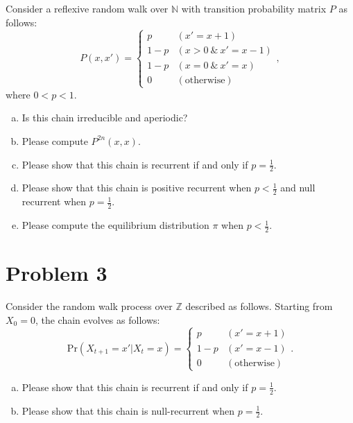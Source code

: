 \documentclass[a4paper,11pt]{article}
\newcommand{\pr}{\mathrm{Pr}}
\newcommand{\nsp}{\mathbb{N}}
\newcommand{\zsp}{\mathbb{Z}}
\begin{document}
Consider a reflexive random walk over $\nsp$ with transition probability matrix $P$ as follows:
\[
P(x, x') = \begin{cases}
     p & (x' = x + 1) \\
     1 - p & (x > 0 \ \& \ x' = x - 1) \\
     1 - p & (x = 0 \ \& \ x' = x) \\
     0 & (\text{otherwise})
 \end{cases},
\]
where $0 < p < 1$. 

\begin{enumerate}[(a)]

\item Is this chain irreducible and aperiodic?

\item Please compute $P^{2n}(x, x)$. 

\item Please show that this chain is recurrent if and only if $p = \frac{1}{2}$.

\item Please show that this chain is positive recurrent when $p < \frac{1}{2}$ and null recurrent when $p = \frac{1}{2}$. 

\item Please compute the equilibrium distribution $\pi$ when $p < \frac{1}{2}$.

\end{enumerate}

\clearpage

\section*{Problem 3}

Consider the random walk process over $\zsp$ described as follows. Starting from $X_0 = 0$, the chain evolves as follows:
\[
\pr(X_{t+1} = x' | X_t = x) = \begin{cases}
     p & (x' = x + 1) \\
     1 - p & (x' = x - 1) \\
     0 & (\text{otherwise})
 \end{cases}.
\]

\begin{enumerate}[(a)]

\item Please show that this chain is recurrent if and only if $p = \frac{1}{2}$.

\item Please show that this chain is null-recurrent when $p = \frac{1}{2}$. 

\end{enumerate}
\end{document}
